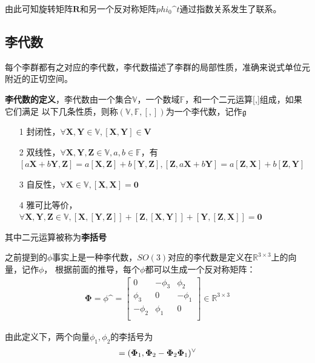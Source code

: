 \documentclass[10pt]{article}
\begin{document}
由此可知旋转矩阵$\mathbf{R}$和另一个反对称矩阵$phi_{0}\sphat t$通过指数关系发生了联系。
\subsection{李代数}
每个李群都有之对应的李代数，李代数描述了李群的局部性质，准确来说式单位元附近的正切空间。

\textbf{李代数的定义}，李代数由一个集合$\mathbb{V}$，一个数域$\mathbb{F}$，和一个二元运算[,]组成，如果它们满足
以下几条性质，则称$(\mathbb{V},\mathbb{F},[,])$为一个李代数，记作$\mathfrak{g}$
\begin{itemize}
\item[1] 封闭性，$\forall\mathbf{X},\mathbf{Y}\in \mathbb{V},[\mathbf{X},\mathbf{Y}]\in\mathbf{V}$
\item[2] 双线性，$\forall\mathbf{X},\mathbf{Y},\mathbf{Z}\in\mathbb{V},a,b\in\mathbb{F}$，有\\
$[a\mathbf{X}+b\mathbf{Y},\mathbf{Z}]=a[\mathbf{X},\mathbf{Z}]+b[\mathbf{Y},\mathbf{Z}],[\mathbf{Z},
a\mathbf{X}+b\mathbf{Y}]=a[\mathbf{Z},\mathbf{X}]+b[\mathbf{Z},\mathbf{Y}]$
\item[3] 自反性，$\forall\mathbf{X}\in\mathbb{V},[\mathbf{X},\mathbf{X}]=\mathbf{0}$
\item[4] 雅可比等价，$\forall\mathbf{X},\mathbf{Y},\mathbf{Z}\in\mathbb{V},[\mathbf{X},[\mathbf{Y},
\mathbf{Z}]]+[\mathbf{Z},[\mathbf{X},\mathbf{Y}]]+[\mathbf{Y},[\mathbf{Z},\mathbf{X}]]=\mathbf{0}$
\end{itemize}
其中二元运算被称为\textbf{李括号}

之前提到的$\phi$事实上是一种李代数，$SO(3)$对应的李代数是定义在$\mathbb{R}^{3\times3}$上的向量，记作$\phi$，
根据前面的推导，每个$\phi$都可以生成一个反对称矩阵：
\begin{align} 
    \mathbf{\Phi}=\phi\sphat=\left[\begin{array}{ccc}0 & -\phi_{3} & \phi_{2}\\ \phi_{3} & 0 & -\phi_{1}\\
        -\phi_{2} & \phi_{1} & 0\\\end{array}\right] \in\mathbb{R}^{3\times3}
\end{align}

由此定义下，两个向量$\phi_{1},\phi_{2}$的李括号为
\begin{align}  
    [\phi_{1},\phi_{2}]=(\mathbf{\Phi}_{1},\mathbf{\Phi}_{2}-\mathbf{\Phi}_{2}\mathbf{\Phi}_{1})\spcheck
\end{align}
\end{document}
